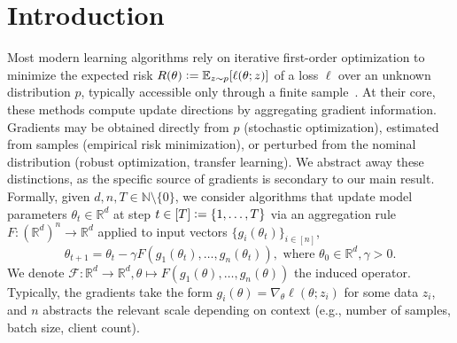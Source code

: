 \documentclass[twoside,11pt]{article}
\newcommand\mb{\mathbb}
\newcommand{\R}{\mathbb{R}}
\newcommand{\E}{\mathbb{E}}
\newcommand{\F}{\mathcal{F}}
\begin{document}
\section{Introduction}\label{I-intro}
Most modern learning algorithms rely on iterative first-order optimization to minimize the expected risk $R(\theta) \vcentcolon= \E_{z \sim p}[\ell(\theta; z)]$ of a loss $\ell$  over an unknown distribution $p$, typically accessible only through a finite sample~\citep{NIPS2007_bottou_bousquet}.
At their core, these methods compute update directions by aggregating gradient information. 
Gradients may be obtained directly from $p$ (stochastic optimization), estimated from samples (empirical risk minimization), or perturbed from the nominal distribution (robust optimization, transfer learning). 
We abstract away these distinctions, as the specific source of gradients is secondary to our main result.
Formally, given $d, n, T \in \mb{N} \setminus \{0\}$, we consider algorithms that update model parameters $\theta_t \in \mb{R}^d$ at step $t \in [T] \vcentcolon= \{1, \ldots, T\}$ via an aggregation rule $F: (\mb{R}^d)^{n} \to \mb{R}^d$ applied to input vectors $\{g_i(\theta_t)\}_{i\in[n]}$,
\begin{equation}\label{eq:algo-update}
    \theta_{t+1} = \theta_t - \gamma F(g_1(\theta_t), \ldots, g_n(\theta_t)), \text{ where } \theta_0 \in \R^d, \gamma > 0.
\end{equation}
We denote $\F: \R^d \to \R^d, \theta \mapsto F(g_1(\theta), \ldots, g_n(\theta))$ the induced operator. %
Typically, the gradients take the form $g_i(\theta) = \nabla_\theta \ell(\theta;z_i)$ for some data $z_i$, and $n$ abstracts the relevant scale depending on context (e.g., number of samples, batch size, client count).
\end{document}
